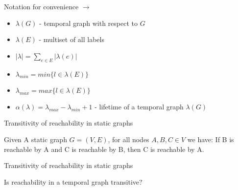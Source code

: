 \documentclass{beamer}
\begin{document}
\begin{frame}{Notation for convenience $\rightarrow$ \cite[p. 243ff]{Michail2015}}
\begin{itemize}
	\item $\lambda(G)$ - temporal graph with respect to $G$
	\item $\lambda(E)$ - multiset of all labels
	\item $| \lambda | = \sum_{e \in E} | \lambda(e) | $
	\item $ \lambda_{min} = min\{l \in \lambda(E)\} $
	\item $ \lambda_{max} = max\{l \in \lambda(E)\} $
	\item $\alpha(\lambda) = \lambda_{max} - \lambda_{min} + 1$ - lifetime of a temporal graph $\lambda(G)$
\end{itemize}
\end{frame}

\begin{frame}{Transitivity of reachability in static graphs}
		\begin{tcolorbox}[theoremstyle, title=Reachability in a static graph is transitive]
      Given A static graph $G = (V, E)$, for all nodes $A, B, C \in V$ we have:
      If B is reachable by A and C is reachable by B, then C is reachable by A. \\
      \begin{center}
     \end{center}
		\end{tcolorbox}
\end{frame}

\begin{frame}{Transitivity of reachability in static graphs}
  \begin{center}
    \large
    Is reachability in a temporal graph transitive?
  \end{center}
\end{frame}
\end{document}
